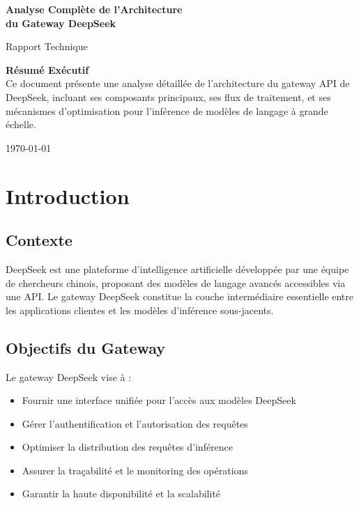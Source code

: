 \documentclass[12pt,a4paper]{article}
\begin{document}
\begin{titlepage}
    \centering
    \vspace*{2cm}
    
    {\Huge\bfseries Analyse Complète de l'Architecture\\[0.5cm] du Gateway DeepSeek\par}
    \vspace{2cm}
    
    {\Large Rapport Technique\par}
    \vspace{1.5cm}
    
    \begin{tcolorbox}[colback=blue!5, colframe=blue!50!black, width=0.8\textwidth, arc=3mm]
        \centering
        \textbf{Résumé Exécutif}\\[0.3cm]
        Ce document présente une analyse détaillée de l'architecture du gateway API de DeepSeek, incluant ses composants principaux, ses flux de traitement, et ses mécanismes d'optimisation pour l'inférence de modèles de langage à grande échelle.
    \end{tcolorbox}
    
    \vfill
    
    {\large \today\par}
\end{titlepage}

\tableofcontents
\newpage

\section{Introduction}

\subsection{Contexte}
DeepSeek est une plateforme d'intelligence artificielle développée par une équipe de chercheurs chinois, proposant des modèles de langage avancés accessibles via une API. Le gateway DeepSeek constitue la couche intermédiaire essentielle entre les applications clientes et les modèles d'inférence sous-jacents.

\subsection{Objectifs du Gateway}
Le gateway DeepSeek vise à :
\begin{itemize}[noitemsep]
    \item Fournir une interface unifiée pour l'accès aux modèles DeepSeek
    \item Gérer l'authentification et l'autorisation des requêtes
    \item Optimiser la distribution des requêtes d'inférence
    \item Assurer la traçabilité et le monitoring des opérations
    \item Garantir la haute disponibilité et la scalabilité
\end{itemize}
\end{document}
